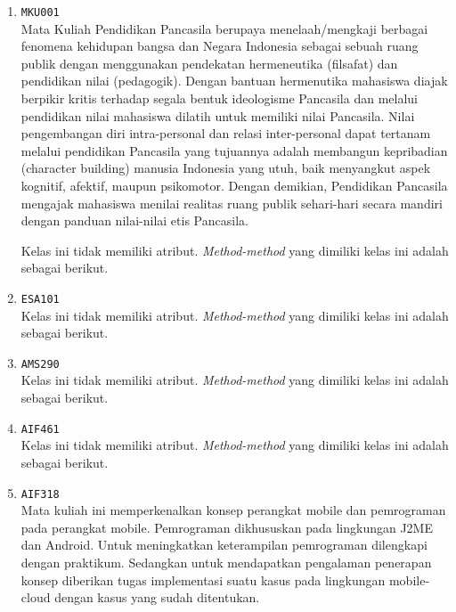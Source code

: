 \documentclass{article}
\begin{document}
\begin{enumerate}
\begin{itemize}
\end{itemize}
\item \texttt{MKU001}\\ 
Mata Kuliah Pendidikan Pancasila berupaya menelaah/mengkaji berbagai fenomena kehidupan 
 bangsa dan Negara Indonesia sebagai sebuah ruang publik dengan menggunakan pendekatan 
 hermeneutika (filsafat) dan pendidikan nilai (pedagogik). Dengan bantuan hermenutika
 mahasiswa diajak berpikir kritis terhadap segala bentuk ideologisme Pancasila dan melalui 
 pendidikan nilai mahasiswa dilatih untuk memiliki nilai Pancasila. Nilai pengembangan diri 
 intra-personal dan relasi inter-personal dapat tertanam melalui pendidikan Pancasila yang 
 tujuannya adalah membangun kepribadian (character building) manusia Indonesia yang utuh, 
 baik menyangkut aspek kognitif, afektif, maupun psikomotor. Dengan demikian, Pendidikan 
 Pancasila mengajak mahasiswa menilai realitas ruang publik sehari-hari secara mandiri 
 dengan panduan nilai-nilai etis Pancasila.

Kelas ini tidak memiliki atribut. \textit{Method-method} yang dimiliki kelas ini adalah sebagai berikut.
\begin{itemize}
\end{itemize}
\item \texttt{ESA101}\\ 
Kelas ini tidak memiliki atribut. \textit{Method-method} yang dimiliki kelas ini adalah sebagai berikut.
\begin{itemize}
\end{itemize}
\item \texttt{AMS290}\\ 
Kelas ini tidak memiliki atribut. \textit{Method-method} yang dimiliki kelas ini adalah sebagai berikut.
\begin{itemize}
\end{itemize}
\item \texttt{AIF461}\\ 
Kelas ini tidak memiliki atribut. \textit{Method-method} yang dimiliki kelas ini adalah sebagai berikut.
\begin{itemize}
\end{itemize}
\item \texttt{AIF318}\\ 
Mata kuliah ini memperkenalkan konsep perangkat mobile dan pemrograman pada perangkat 
 mobile. Pemrograman dikhususkan pada lingkungan J2ME dan Android.
 Untuk meningkatkan keterampilan pemrograman dilengkapi dengan praktikum. 
 Sedangkan untuk mendapatkan pengalaman penerapan konsep diberikan tugas implementasi suatu 
 kasus pada lingkungan mobile-cloud dengan kasus yang sudah ditentukan.


\end{enumerate}
\end{document}
